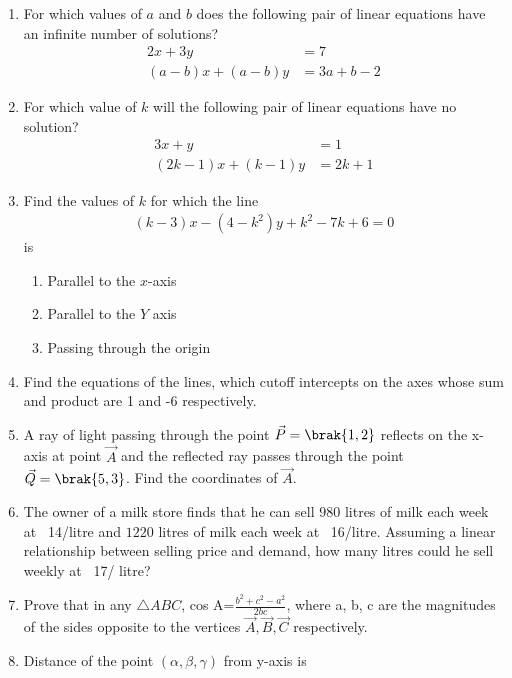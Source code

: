 \begin{enumerate}[label=\thesubsection.\arabic*, ref=\thesubsection.\theenumi]
  \item For which values of $a$ and $b$ does the following pair of linear equations have an infinite number of solutions?
	\begin{align}
		2x+3y&=7\\
		(a-b)x+(a-b)y&=3a+b-2
	\end{align}
  \item For which value of $k$ will the following pair of linear equations have no solution?
	\begin{align}
		3x+y&=1\\
		(2k-1)x+(k-1)y&=2k+1
	\end{align}
\item Find the values of $k$ for which the line 
\begin{align}
(k-3)x-(4-k^2)y+k^2-7k+6=0 \label{eq:chapters/11/10/4/1/1}
\end{align}
is
\begin{enumerate}
\item Parallel to the $x$-axis
\item Parallel to the $Y$ axis
\item Passing through the origin
\end{enumerate}
    \solution 
		
	\item Find the  equations of the lines,  which cutoff intercepts on the axes  whose sum and product are 1 and -6 respectively.
\\
\solution
		
\item A ray of light passing through the point $\vec{P} = \brak{1,  2}$ reflects on the x-axis at point $\vec{A}$ and the reflected ray passes through the point $\vec{Q} =\brak{5,  3}$. Find the coordinates of $\vec{A}$.
\\
    \solution 
		
\item The owner of a milk store finds that he can sell $980$ litres of milk each week at \rupee~14/litre and $1220$ litres of milk each week at \rupee~16/litre. Assuming a linear relationship between selling price and demand,  how many litres could he sell weekly at \rupee~17/ litre?
\item Prove that in any $\triangle{ABC}$,  cos A=$\frac{b^2+c^2-a^2}{2bc}$,  where a, b, c are the magnitudes of the sides opposite to the vertices $\vec{A}, \vec{B}, \vec{C}$ respectively.
\item Distance of the point $(\alpha,  \beta,  \gamma)$ from y-axis is

\end{enumerate}
